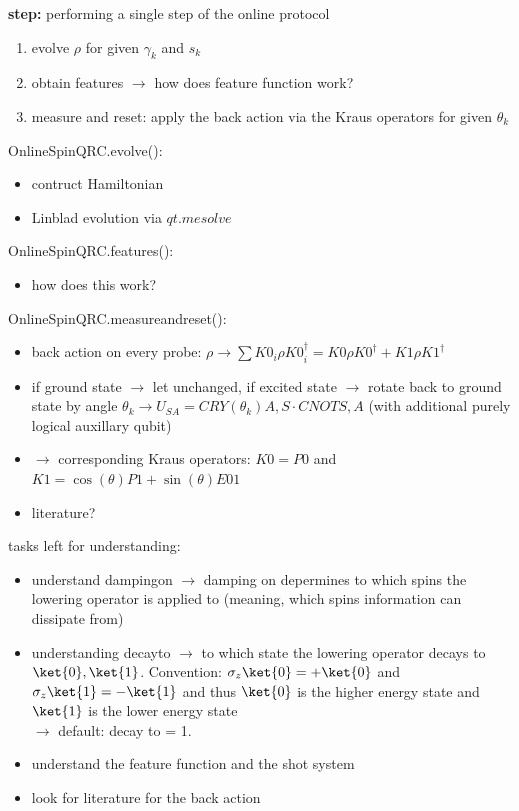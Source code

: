 \textbf{step:}
performing a single step of the online protocol
\begin{enumerate}
    \item evolve $\rho$ for given $\gamma_k$ and $s_k$
    \item obtain features $\to$ how does feature function work?
    \item measure and reset: apply the back action via the Kraus operators for given $\theta_k$
\end{enumerate}

OnlineSpinQRC.evolve():
\begin{itemize}
    \item contruct Hamiltonian
    \item Linblad evolution via $qt.mesolve$
\end{itemize}

OnlineSpinQRC.features():
\begin{itemize}
    \item how does this work?
\end{itemize}

OnlineSpinQRC.measureandreset():
\begin{itemize}
    \item back action on every probe: $\rho \to \sum K0_i \rho K0_i^\dagger = K0 \rho K0^\dagger + K1 \rho K1^\dagger$
    \item if ground state $\to$ let unchanged, if excited state $\to$ rotate back to ground state by angle $\theta_k \to U_{SA} = CRY(\theta_k){A,S} \cdot CNOT{S,A}$ (with additional purely logical auxillary qubit)
    \item $\to$ corresponding Kraus operators: $K0 = P0$ and $K1 = \cos(\theta)P1 + \sin(\theta)E01$
    \item literature?
\end{itemize}

tasks left for understanding:
\begin{itemize}
    \item understand dampingon $\to$ damping on depermines to which spins the lowering operator is applied to (meaning, which spins information can dissipate from)
    \item understanding decayto $\to$ to which state the lowering operator decays to $\ket{0}, \ket{1}$. Convention: $\sigma_z \ket{0} = +\ket{0}$ and $\sigma_z \ket{1} = -\ket{1}$ and thus $\ket{0}$ is the higher energy state and $\ket{1}$ is the lower energy state \\$\to$ default: decay to = 1.    \item understand the feature function and the shot system
    \item look for literature for the back action
\end{itemize}

